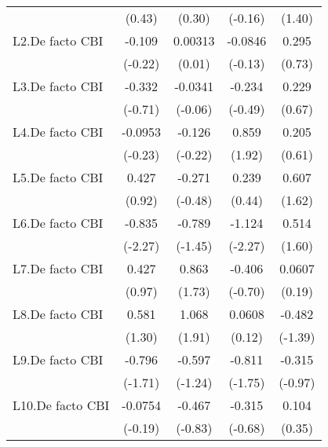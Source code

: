 {\begin{longtable}{l*{4}{c}}
                &   (0.43)         &   (0.30)         &  (-0.16)         &   (1.40)         \\
[1em]
L2.De facto CBI &   -0.109         &  0.00313         &  -0.0846         &    0.295         \\
                &  (-0.22)         &   (0.01)         &  (-0.13)         &   (0.73)         \\
[1em]
L3.De facto CBI &   -0.332         &  -0.0341         &   -0.234         &    0.229         \\
                &  (-0.71)         &  (-0.06)         &  (-0.49)         &   (0.67)         \\
[1em]
L4.De facto CBI &  -0.0953         &   -0.126         &    0.859         &    0.205         \\
                &  (-0.23)         &  (-0.22)         &   (1.92)         &   (0.61)         \\
[1em]
L5.De facto CBI &    0.427         &   -0.271         &    0.239         &    0.607         \\
                &   (0.92)         &  (-0.48)         &   (0.44)         &   (1.62)         \\
[1em]
L6.De facto CBI &   -0.835\sym{*}  &   -0.789         &   -1.124\sym{*}  &    0.514         \\
                &  (-2.27)         &  (-1.45)         &  (-2.27)         &   (1.60)         \\
[1em]
L7.De facto CBI &    0.427         &    0.863         &   -0.406         &   0.0607         \\
                &   (0.97)         &   (1.73)         &  (-0.70)         &   (0.19)         \\
[1em]
L8.De facto CBI &    0.581         &    1.068         &   0.0608         &   -0.482         \\
                &   (1.30)         &   (1.91)         &   (0.12)         &  (-1.39)         \\
[1em]
L9.De facto CBI &   -0.796         &   -0.597         &   -0.811         &   -0.315         \\
                &  (-1.71)         &  (-1.24)         &  (-1.75)         &  (-0.97)         \\
[1em]
L10.De facto CBI&  -0.0754         &   -0.467         &   -0.315         &    0.104         \\
                &  (-0.19)         &  (-0.83)         &  (-0.68)         &   (0.35)         \\

\end{longtable}}
